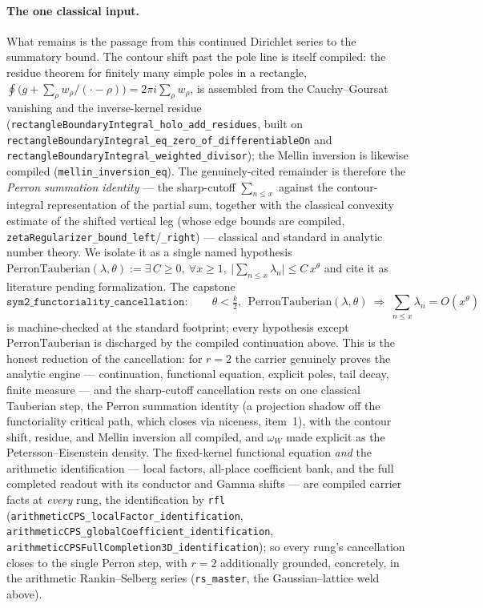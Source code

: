 \documentclass[11pt]{article}
\theoremstyle{definition}
\begin{document}
\paragraph{The one classical input.} What remains is the passage from this continued Dirichlet
series to the summatory bound. The contour shift past the pole line is itself compiled: the
residue theorem for finitely many simple poles in a rectangle,
$\oint\bigl(g+\sum_\rho w_\rho/(\cdot-\rho)\bigr)=2\pi i\sum_\rho w_\rho$, is assembled from the
Cauchy--Goursat vanishing and the inverse-kernel residue
(\texttt{rectangleBoundaryIntegral\_holo\_add\_residues}, built on
\texttt{rectangleBoundaryIntegral\_eq\_zero\_of\_differentiableOn} and
\texttt{rectangleBoundaryIntegral\_weighted\_divisor}); the Mellin inversion is likewise compiled
(\texttt{mellin\_inversion\_eq}). The genuinely-cited remainder is therefore the \emph{Perron
summation identity} --- the sharp-cutoff $\sum_{n\le x}$ against the contour-integral representation
of the partial sum, together with the classical convexity estimate of the shifted vertical leg
(whose edge bounds are compiled, \texttt{zetaRegularizer\_bound\_left}/\texttt{\_right}) --- classical
and standard in analytic number theory. We isolate it as a
single named hypothesis $\mathrm{PerronTauberian}(\lambda,\theta):=\exists\,C\ge0,\
\forall x\ge1,\ \lvert\sum_{n\le x}\lambda_n\rvert\le C\,x^\theta$ and cite it as literature
pending formalization. The capstone
\[
  \texttt{sym2\_functoriality\_cancellation}:\qquad
  \theta<\tfrac k2,\ \ \mathrm{PerronTauberian}(\lambda,\theta)\ \Longrightarrow\
  \sum_{n\le x}\lambda_n=O(x^\theta)
\]
is machine-checked at the standard footprint; every hypothesis except $\mathrm{PerronTauberian}$
is discharged by the compiled continuation above. This is the honest reduction of the
cancellation: for $r=2$ the carrier genuinely proves the analytic engine --- continuation,
functional equation, explicit poles, tail decay, finite measure --- and the sharp-cutoff cancellation
rests on one
classical Tauberian step, the Perron summation identity (a projection shadow off the functoriality
critical path, which closes via niceness, item~1), with the contour shift, residue, and
Mellin inversion all compiled, and $\omega_W$ made explicit as the
Petersson--Eisenstein density. The fixed-kernel functional equation \emph{and} the arithmetic
identification --- local factors, all-place coefficient bank, and the full completed readout with
its conductor and Gamma shifts --- are compiled carrier facts at \emph{every} rung, the
identification by \texttt{rfl} (\texttt{arithmeticCPS\_localFactor\_identification},
\texttt{arithmeticCPS\_globalCoefficient\_identification},
\texttt{arithmeticCPSFullCompletion3D\_identification}); so every rung's cancellation closes to the
single Perron step, with $r=2$ additionally grounded, concretely, in the arithmetic Rankin--Selberg series
(\texttt{rs\_master}, the Gaussian--lattice weld above).
\end{document}
